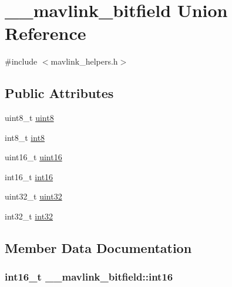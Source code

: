 \hypertarget{union____mavlink__bitfield}{}\section{\+\_\+\+\_\+mavlink\+\_\+bitfield Union Reference}
\label{union____mavlink__bitfield}


{\ttfamily \#include $<$mavlink\+\_\+helpers.\+h$>$}

\subsection*{Public Attributes}
\begin{DoxyCompactItemize}
\item 
uint8\+\_\+t \hyperlink{union____mavlink__bitfield_ade669a5f63c53f0d61f636eff94417c0}{uint8}
\item 
int8\+\_\+t \hyperlink{union____mavlink__bitfield_a50a846d427d7a1d7dc79235c87597622}{int8}
\item 
uint16\+\_\+t \hyperlink{union____mavlink__bitfield_a0ca76ce4a09ee26387e50b6702c17894}{uint16}
\item 
int16\+\_\+t \hyperlink{union____mavlink__bitfield_a99cd7f966d8a59b29d05197b39c5b229}{int16}
\item 
uint32\+\_\+t \hyperlink{union____mavlink__bitfield_ab43ed56310c2d778ebaa7a5a21cb6587}{uint32}
\item 
int32\+\_\+t \hyperlink{union____mavlink__bitfield_a07bd702e8b91679a25e632ad90d0a1ec}{int32}
\end{DoxyCompactItemize}


\subsection{Member Data Documentation}
\subsubsection[{\texorpdfstring{int16}{int16}}]{\setlength{\rightskip}{0pt plus 5cm}int16\+\_\+t \+\_\+\+\_\+mavlink\+\_\+bitfield\+::int16}\hypertarget{union____mavlink__bitfield_a99cd7f966d8a59b29d05197b39c5b229}{}\label{union____mavlink__bitfield_a99cd7f966d8a59b29d05197b39c5b229}

